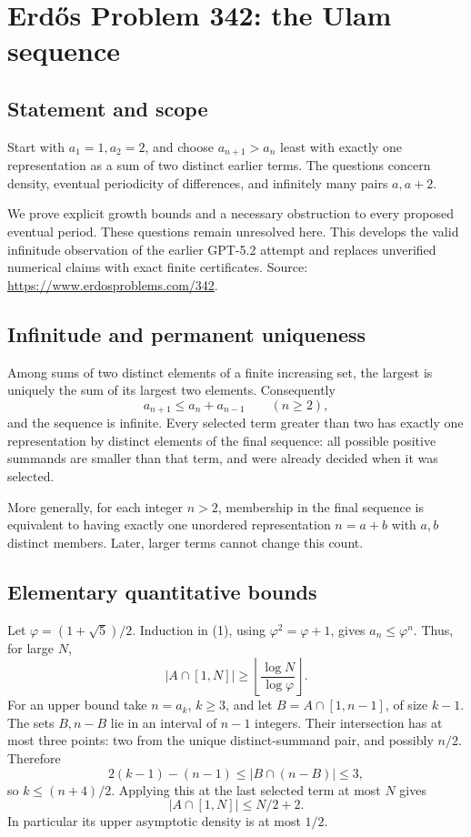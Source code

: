 \section*{Erd\H{o}s Problem 342: the Ulam sequence}
\subsection*{Statement and scope}
Start with $a_1=1,a_2=2$, and choose $a_{n+1}>a_n$ least with exactly one representation as a sum of two distinct earlier terms. The questions concern density, eventual periodicity of differences, and infinitely many pairs $a,a+2$.

We prove explicit growth bounds and a necessary obstruction to every proposed eventual period. These questions remain unresolved here. This develops the valid infinitude observation of the earlier GPT-5.2 attempt and replaces unverified numerical claims with exact finite certificates. Source: \url{https://www.erdosproblems.com/342}.

\subsection*{Infinitude and permanent uniqueness}
Among sums of two distinct elements of a finite increasing set, the largest is uniquely the sum of its largest two elements. Consequently
\[
 a_{n+1}\le a_n+a_{n-1}\qquad(n\ge2), \tag{1}
\]
and the sequence is infinite. Every selected term greater than two has exactly one representation by distinct elements of the final sequence: all possible positive summands are smaller than that term, and were already decided when it was selected.

More generally, for each integer $n>2$, membership in the final sequence is equivalent to having exactly one unordered representation $n=a+b$ with $a,b$ distinct members. Later, larger terms cannot change this count.

\subsection*{Elementary quantitative bounds}
Let $\varphi=(1+\sqrt5)/2$. Induction in (1), using $\varphi^2=\varphi+1$, gives $a_n\le\varphi^n$. Thus, for large $N$,
\[
 |A\cap[1,N]|\ge\left\lfloor\frac{\log N}{\log\varphi}\right\rfloor.
\]
For an upper bound take $n=a_k$, $k\ge3$, and let $B=A\cap[1,n-1]$, of size $k-1$. The sets $B,n-B$ lie in an interval of $n-1$ integers. Their intersection has at most three points: two from the unique distinct-summand pair, and possibly $n/2$. Therefore
\[
 2(k-1)-(n-1)\le |B\cap(n-B)|\le3,
\]
so $k\le(n+4)/2$. Applying this at the last selected term at most $N$ gives
\[
 |A\cap[1,N]|\le N/2+2. \tag{2}
\]
In particular its upper asymptotic density is at most $1/2$.

